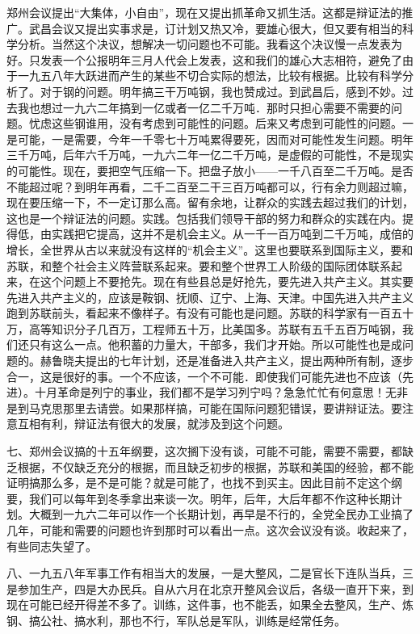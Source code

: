 郑州会议提出“大集体，小自由”，现在又提出抓革命又抓生活。这都是辩证法的推广。武昌会议又提出实事求是，订计划又热又冷，要雄心很大，但又要有相当的科学分析。当然这个决议，想解决一切问题也不可能。我看这个决议慢一点发表为好。只发表一个公报明年三月人代会上发表，这和我们的雄心大志相符，避免了由于一九五八年大跃进而产生的某些不切合实际的想法，比较有根据。比较有科学分析了。对于钢的问题。明年搞三干万吨钢，我也赞成过。到武昌后，感到不妙。过去我也想过一九六二年搞到一亿或者一亿二千万吨．那时只担心需要不需要的问题。忧虑这些钢谁用，没有考虑到可能性的问题。后来又考虑到可能性的问题。一是可能，一是需要，今年一千零七十万吨累得要死，因而对可能性发生问题。明年三千万吨，后年六千万吨，一九六二年一亿二千万吨，是虚假的可能性，不是现实的可能性。现在，要把空气压缩一下。把盘子放小——一千八百至二千万吨。是否不能超过呢？到明年再看，二千二百至二干三百万吨都可以，行有余力则超过嘛，现在要压缩一下，不一定订那么高。留有余地，让群众的实践去超过我们的计划，这也是一个辩证法的问题。实践。包括我们领导干部的努力和群众的实践在内。提得低，由实践把它提高，这并不是机会主义。从一千一百万吨到二千万吨，成倍的增长，全世界从古以来就没有这样的“机会主义”。这里也要联系到国际主义，要和苏联，和整个社会主义阵营联系起来。要和整个世界工人阶级的国际团体联系起来，在这个问题上不要抢先。现在有些县总是好抢先，要先进入共产主义。其实要先进入共产主义的，应该是鞍钢、抚顺、辽宁、上海、天津。中国先进入共产主义跑到苏联前头，看起来不像样子。有没有可能也是问题。苏联的科学家有一百五十万，高等知识分子几百万，工程师五十万，比美国多。苏联有五千五百万吨钢，我们还只有这么一点。他积蓄的力量大，干部多，我们才开始。所以可能性也是成问题的。赫鲁晓夫提出的七年计划，还是准备进入共产主义，提出两种所有制，逐步合一，这是很好的事。一个不应该，一个不可能．即使我们可能先进也不应该（先进）。十月革命是列宁的事业，我们都不是学习列宁吗？急急忙忙有何意思！无非是到马克思那里去请尝。如果那样搞，可能在国际问题犯错误，要讲辩证法。要注意互相有利，辩证法有很大的发展，就涉及到这个问题。

七、郑州会议搞的十五年纲要，这次搁下没有谈，可能不可能，需要不需要，都缺乏根据，不仅缺乏充分的根据，而且缺乏初步的根据，苏联和美国的经验，都不能证明搞那么多，是不是可能？就是可能了，也找不到买主。因此目前不定这个纲要，我们可以每年到冬季拿出来谈一次。明年，后年，大后年都不作这种长期计划。大概到一九六二年可以作一个长期计划，再早是不行的，全党全民办工业搞了几年，可能和需要的问题也许到那时可以看出一点。这次会议没有谈。收起来了，有些同志失望了。

八、一九五八年军事工作有相当大的发展，一是大整风，二是官长下连队当兵，三是参加生产，四是大办民兵。自从六月在北京开整风会议后，各级一直开下来，到现在可能已经开得差不多了。训练，这件事，也不能丢，如果全去整风，生产、炼钢、搞公社、搞水利，那也不行，军队总是军队，训练是经常任务。

